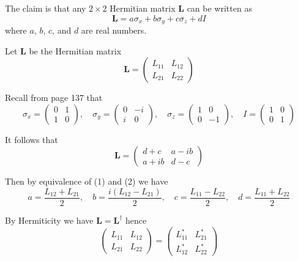 


\bigskip
The claim is that any $2\times2$ Hermitian matrix $\mathbf L$ can be written as
\begin{equation*}
\mathbf L=a\sigma_x+b\sigma_y+c\sigma_z+dI
\end{equation*}
where $a$, $b$, $c$, and $d$ are real numbers.

\bigskip
Let $\mathbf L$ be the Hermitian matrix
\begin{equation*}
\mathbf L=\begin{pmatrix}L_{11}&L_{12}\\L_{21}&L_{22}\end{pmatrix}
\tag{1}
\end{equation*}

Recall from page 137 that
\begin{equation*}
\sigma_x=\begin{pmatrix}0&1\\1&0\end{pmatrix},
\quad
\sigma_y=\begin{pmatrix}0&-i\\i&0\end{pmatrix},
\quad
\sigma_z=\begin{pmatrix}1&0\\0&-1\end{pmatrix},
\quad
I=\begin{pmatrix}1&0\\0&1\end{pmatrix}
\end{equation*}

It follows that
\begin{equation*}
\mathbf L=\begin{pmatrix}d+c&a-ib\\a+ib&d-c\end{pmatrix}
\tag{2}
\end{equation*}

Then by equivalence of (1) and (2) we have
\begin{equation*}
a=\frac{L_{12}+L_{21}}{2},
\quad
b=\frac{i(L_{12}-L_{21})}{2},
\quad
c=\frac{L_{11}-L_{22}}{2},
\quad
d=\frac{L_{11}+L_{22}}{2}
\end{equation*}

By Hermiticity we have $\mathbf L=\mathbf L^\dag$ hence
\begin{equation*}
\begin{pmatrix}L_{11}&L_{12}\\L_{21}&L_{22}\end{pmatrix}
=\begin{pmatrix}L_{11}^*&L_{21}^*\\L_{12}^*&L_{22}^*\end{pmatrix}
\end{equation*}

